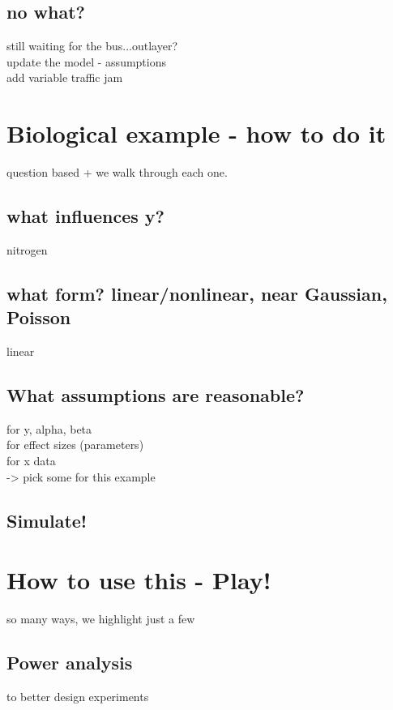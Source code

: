 \documentclass{article}
\begin{document}
	\subsection*{no what?}
	still waiting for the bus...outlayer?\\
	update the model - assumptions\\
	add variable traffic jam\\
	
	
\section{Biological example - how to do it}
question based + we walk through each one.\\

			\subsection*{what influences y?}
			nitrogen
	
			\subsection*{what form? linear/nonlinear, near Gaussian, Poisson}
			linear
	
			\subsection*{What assumptions are reasonable?}
			for y, alpha, beta\\
			for effect sizes (parameters)\\
			for x data\\
			-> pick some for this example\\
	
			\subsection*{Simulate! }
			
	
\section*{How to use this - Play!}
so many ways, we highlight just a few 

			\subsection*{Power analysis}
			to better design experiments\\
	
\end{document}
